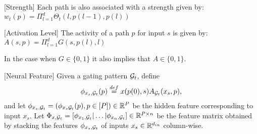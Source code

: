 \begin{definition}\label{def:strength}[Strength]
Each path is also associated with a strength given by: $w_t(p)=\Pi_{l=1}^d \Theta_t(l,p(l-1),p(l))$
\end{definition}

\begin{definition}\label{def:activity}[Activation Level]
The activity of a path $p$ for input $s$ is given by: $A(s,p)=\Pi_{l=1}^d G(s,p(l),l)$
\end{definition}
In the case when $G\in \{0,1\}$ it also implies that $A\in \{0,1\}$.  %

\begin{definition}\label{def:feature}[Neural Feature]
Given a gating pattern $\mathcal{G}_t$, define 
\begin{align}
\phi_{x_s,\mathcal{G}_t}(p)\stackrel{def}=x(p(0),s) A_{\mathcal{G}_t}(x_s,p),
\end{align}
and let $\phi_{x_s,\mathcal{G}_t}=(\phi_{x_s\mathcal{G}_t}(p),p\in [P])\in \mathbb{R}^P$ be the hidden feature corresponding to input $x_s$. Let $\Phi_{x,\mathcal{G}_t}=\left[\phi_{x_1,\mathcal{G}_t}| \ldots |\phi_{x_n,\mathcal{G}_t}\right]\in \mathbb{R}^{P\times n}$ be the feature matrix obtained by stacking the features $\phi_{x_s,\mathcal{G}_t}$ of inputs $x_s\in \mathbb{R}^{d_{in}}$ column-wise.
\end{definition}

